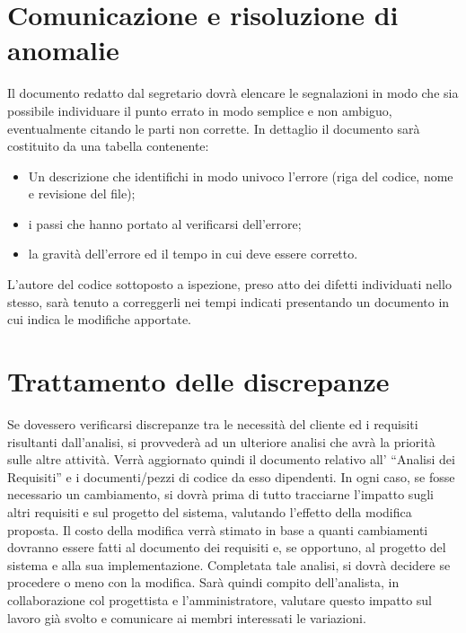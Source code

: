 \section{Comunicazione e risoluzione di anomalie}
Il documento redatto dal segretario dovr\`a elencare le segnalazioni in modo che sia possibile individuare il punto errato in modo semplice e non ambiguo, eventualmente citando le parti non corrette. In dettaglio il documento sar\`a costituito da una tabella contenente:
\begin{itemize}
\item Un descrizione che identifichi in modo univoco l'errore (riga del codice, nome e revisione del file);
\item i passi che hanno portato al verificarsi dell'errore;
\item la gravit\`a dell'errore ed il tempo in cui deve essere corretto.
\end{itemize}
L'autore del codice sottoposto a ispezione, preso atto dei difetti individuati nello stesso, sar\`a tenuto a correggerli nei tempi indicati presentando un documento in cui indica le modifiche apportate.

\section{Trattamento delle discrepanze} 
Se dovessero verificarsi discrepanze tra le necessit\`a del cliente ed i requisiti risultanti dall'analisi, si provveder\`a ad un ulteriore analisi che avr\`a la priorit\`a sulle altre attivit\`a. Verr\`a aggiornato quindi il documento relativo all' ``Analisi dei Requisiti'' e  i documenti/pezzi di codice da esso dipendenti. In ogni caso, se fosse necessario un cambiamento, si dovr\`a prima di tutto tracciarne l'impatto sugli altri requisiti e sul progetto del sistema, valutando l'effetto della modifica proposta. Il costo della modifica verr\`a stimato in base a quanti cambiamenti dovranno essere fatti al documento dei requisiti e, se opportuno, al progetto del sistema e alla sua implementazione. Completata tale analisi, si dovr\`a decidere se procedere o meno con la modifica. Sar\`a quindi compito dell'analista, in collaborazione col progettista e l'amministratore, valutare questo impatto sul lavoro gi\`a svolto e comunicare ai membri interessati le variazioni.

